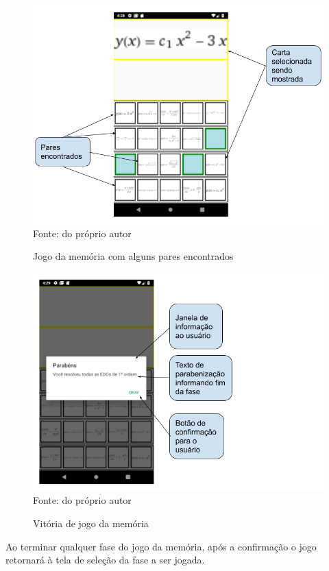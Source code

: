 \begin{figure}[H]
\centering
\caption{Jogo da memória com alguns pares encontrados}
\includegraphics[scale=0.72]{figuras/resolucaoCartasAcertadas.png}
\small{Fonte: do próprio autor}
\end{figure}

\begin{figure}[H]
\centering
\caption{Vitória de jogo da memória}
\includegraphics[scale=0.72]{figuras/resolucao_fim.png}
\small{Fonte: do próprio autor}
\end{figure}

Ao terminar qualquer fase do jogo da memória, após a confirmação o jogo retornará à tela de seleção da fase a ser jogada.

